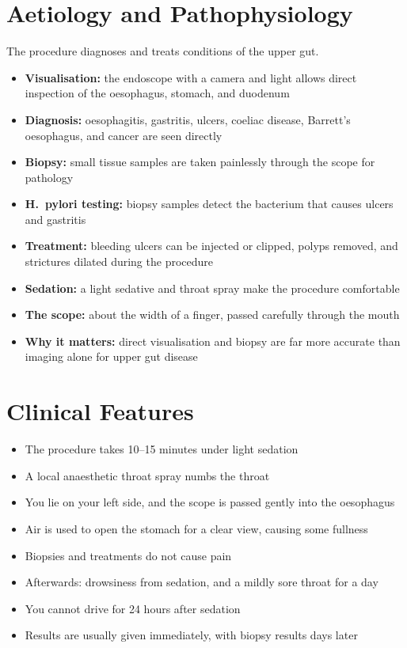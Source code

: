 \section*{Aetiology and Pathophysiology}
The procedure diagnoses and treats conditions of the upper gut.
\begin{itemize}
    \item \textbf{Visualisation:} the endoscope with a camera and light allows direct inspection of the oesophagus, stomach, and duodenum
    \item \textbf{Diagnosis:} oesophagitis, gastritis, ulcers, coeliac disease, Barrett's oesophagus, and cancer are seen directly
    \item \textbf{Biopsy:} small tissue samples are taken painlessly through the scope for pathology
    \item \textbf{H.\ pylori testing:} biopsy samples detect the bacterium that causes ulcers and gastritis
    \item \textbf{Treatment:} bleeding ulcers can be injected or clipped, polyps removed, and strictures dilated during the procedure
    \item \textbf{Sedation:} a light sedative and throat spray make the procedure comfortable
    \item \textbf{The scope:} about the width of a finger, passed carefully through the mouth
    \item \textbf{Why it matters:} direct visualisation and biopsy are far more accurate than imaging alone for upper gut disease
\end{itemize}

\section*{Clinical Features}
\begin{itemize}
    \item The procedure takes 10--15 minutes under light sedation
    \item A local anaesthetic throat spray numbs the throat
    \item You lie on your left side, and the scope is passed gently into the oesophagus
    \item Air is used to open the stomach for a clear view, causing some fullness
    \item Biopsies and treatments do not cause pain
    \item Afterwards: drowsiness from sedation, and a mildly sore throat for a day
    \item You cannot drive for 24 hours after sedation
    \item Results are usually given immediately, with biopsy results days later
\end{itemize}

